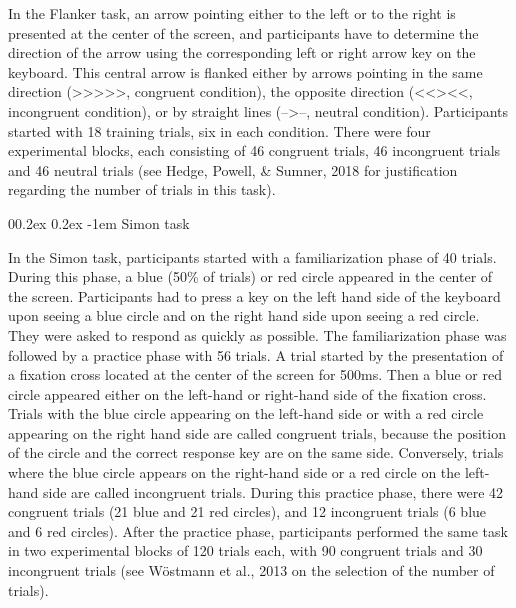 \documentclass[
  man,floatsintext]{apa6}
\makeatletter
\let\oldparagraph\paragraph
\renewcommand{\paragraph}[1]{\oldparagraph{#1}\mbox{}}
\renewcommand{\paragraph}{\@startsection{paragraph}{4}{\parindent}%
  {0\baselineskip \@plus 0.2ex \@minus 0.2ex}%
  {-1em}%
  {\normalfont\normalsize\bfseries\itshape\typesectitle}}
\makeatother
\begin{document}
In the Flanker task, an arrow pointing either to the left or to the right is presented at the center of the screen, and participants have to determine the direction of the arrow using the corresponding left or right arrow key on the keyboard. This central arrow is flanked either by arrows pointing in the same direction (\textgreater\textgreater\textgreater\textgreater\textgreater, congruent condition), the opposite direction (\textless\textless\textgreater\textless\textless, incongruent condition), or by straight lines (--\textgreater--, neutral condition). Participants started with 18 training trials, six in each condition. There were four experimental blocks, each consisting of 46 congruent trials, 46 incongruent trials and 46 neutral trials (see Hedge, Powell, \& Sumner, 2018 for justification regarding the number of trials in this task).

\hypertarget{simon-task}{%
\paragraph{Simon task}\label{simon-task}}

In the Simon task, participants started with a familiarization phase of 40 trials. During this phase, a blue (50\% of trials) or red circle appeared in the center of the screen. Participants had to press a key on the left hand side of the keyboard upon seeing a blue circle and on the right hand side upon seeing a red circle. They were asked to respond as quickly as possible. The familiarization phase was followed by a practice phase with 56 trials. A trial started by the presentation of a fixation cross located at the center of the screen for 500ms. Then a blue or red circle appeared either on the left-hand or right-hand side of the fixation cross. Trials with the blue circle appearing on the left-hand side or with a red circle appearing on the right hand side are called congruent trials, because the position of the circle and the correct response key are on the same side. Conversely, trials where the blue circle appears on the right-hand side or a red circle on the left-hand side are called incongruent trials. During this practice phase, there were 42 congruent trials (21 blue and 21 red circles), and 12 incongruent trials (6 blue and 6 red circles). After the practice phase, participants performed the same task in two experimental blocks of 120 trials each, with 90 congruent trials and 30 incongruent trials (see Wöstmann et al., 2013 on the selection of the number of trials).
\end{document}
